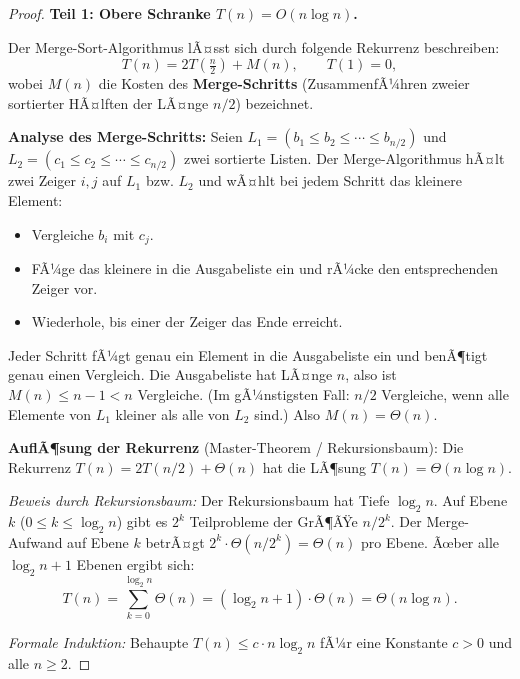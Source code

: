 ﻿\documentclass[a4paper,12pt]{report}
\theoremstyle{definition}
\begin{document}
\begin{proof}
    \textbf{Teil 1: Obere Schranke $T(n) = O(n \log n)$.}

    Der Merge-Sort-Algorithmus lÃ¤sst sich durch folgende Rekurrenz
    beschreiben:
    \[
        T(n) = 2 T\!\left(\tfrac{n}{2}\right) + M(n),
        \qquad T(1) = 0,
    \]
    wobei $M(n)$ die Kosten des \textbf{Merge-Schritts}
    (ZusammenfÃ¼hren zweier sortierter HÃ¤lften der LÃ¤nge $n/2$)
    bezeichnet.

    \textbf{Analyse des Merge-Schritts:}
    Seien $L_1 = (b_1 \leq b_2 \leq \cdots \leq b_{n/2})$ und
    $L_2 = (c_1 \leq c_2 \leq \cdots \leq c_{n/2})$ zwei sortierte
    Listen. Der Merge-Algorithmus hÃ¤lt zwei Zeiger $i, j$ auf $L_1$
    bzw. $L_2$ und wÃ¤hlt bei jedem Schritt das kleinere Element:

    \begin{itemize}
        \item[-] Vergleiche $b_i$ mit $c_j$.
        \item[-] FÃ¼ge das kleinere in die Ausgabeliste ein und
              rÃ¼cke den entsprechenden Zeiger vor.
        \item[-] Wiederhole, bis einer der Zeiger das Ende erreicht.
    \end{itemize}

    Jeder Schritt fÃ¼gt genau ein Element in die Ausgabeliste ein
    und benÃ¶tigt genau einen Vergleich. Die Ausgabeliste hat LÃ¤nge $n$,
    also ist $M(n) \leq n - 1 < n$ Vergleiche.
    (Im gÃ¼nstigsten Fall: $n/2$ Vergleiche, wenn alle Elemente von
    $L_1$ kleiner als alle von $L_2$ sind.)
    Also $M(n) = \Theta(n)$.

    \textbf{AuflÃ¶sung der Rekurrenz} (Master-Theorem / Rekursionsbaum):
    Die Rekurrenz $T(n) = 2T(n/2) + \Theta(n)$ hat die LÃ¶sung
    $T(n) = \Theta(n \log n)$.

    \emph{Beweis durch Rekursionsbaum:}
    Der Rekursionsbaum hat Tiefe $\log_2 n$. Auf Ebene $k$
    ($0 \leq k \leq \log_2 n$) gibt es $2^k$ Teilprobleme der
    GrÃ¶ÃŸe $n/2^k$. Der Merge-Aufwand auf Ebene $k$ betrÃ¤gt
    $2^k \cdot \Theta(n/2^k) = \Theta(n)$ pro Ebene.
    Ãœber alle $\log_2 n + 1$ Ebenen ergibt sich:
    \[
        T(n) = \sum_{k=0}^{\log_2 n} \Theta(n)
        = (\log_2 n + 1) \cdot \Theta(n)
        = \Theta(n \log n).
    \]

    \emph{Formale Induktion:} Behaupte $T(n) \leq c \cdot n \log_2 n$
    fÃ¼r eine Konstante $c > 0$ und alle $n \geq 2$.


\end{proof}
\end{document}
